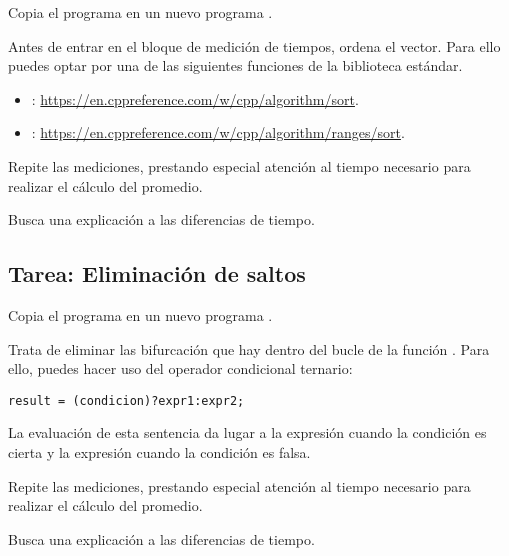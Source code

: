 Copia el programa  en un nuevo programa .

Antes de entrar en el bloque de medición de tiempos, ordena el vector. Para ello
puedes optar por una de las siguientes funciones de la biblioteca estándar.

\begin{itemize}
  \item {}: \url{https://en.cppreference.com/w/cpp/algorithm/sort}.
  \item {}: \url{https://en.cppreference.com/w/cpp/algorithm/ranges/sort}.
\end{itemize}

Repite las mediciones, prestando especial atención al tiempo necesario para
realizar el cálculo del promedio. 

Busca una explicación a las diferencias de tiempo.

\subsection{Tarea: Eliminación de saltos}

Copia el programa  en un nuevo programa .

Trata de eliminar las bifurcación que hay dentro del bucle de la función . 
Para ello, puedes hacer uso del operador condicional ternario:

\begin{lstlisting}
result = (condicion)?expr1:expr2;
\end{lstlisting}

La evaluación de esta sentencia da lugar a la expresión  cuando la condición
es cierta y la expresión  cuando la condición es falsa.

Repite las mediciones, prestando especial atención al tiempo necesario para
realizar el cálculo del promedio. 

Busca una explicación a las diferencias de tiempo.
